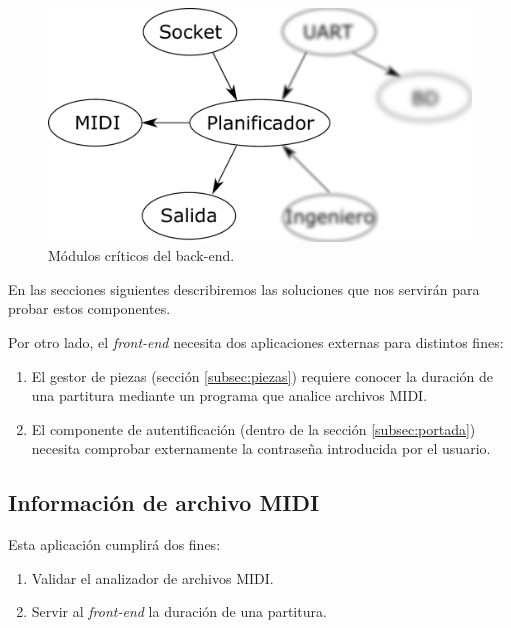 \begin{figure}[H]
	\noindent \begin{centering}
		\includegraphics[width=\linewidth/2]{capitulo4/daemon_critical}
		\par\end{centering}
	\smallskip
	\caption{\label{fig:daemon_critical} Módulos críticos del back-end.}
\end{figure} 

\smallskip

En las secciones siguientes describiremos las soluciones que nos servirán para probar estos componentes.

Por otro lado, el \textit{front-end} necesita dos aplicaciones externas para distintos fines:

\begin{enumerate}
	\item El gestor de piezas (sección \ref{subsec:piezas}) requiere conocer la duración de una partitura mediante un programa que analice archivos \acrshort{MIDI}.
	\item El componente de autentificación (dentro de la sección \ref{subsec:portada}) necesita comprobar externamente la contraseña introducida por el usuario.
\end{enumerate}

\subsection{Información de archivo MIDI}
\label{subsec:midinfo}

Esta aplicación cumplirá dos fines:

\begin{enumerate}
	\item Validar el analizador de archivos \acrshort{MIDI}.
	\item Servir al \textit{front-end} la duración de una partitura.
\end{enumerate}

